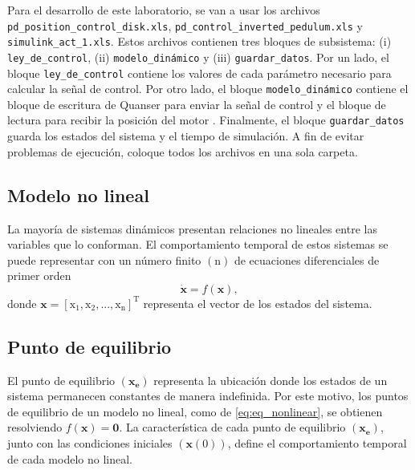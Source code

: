 	Para el desarrollo de este laboratorio, se van a usar los archivos \texttt{pd\_position\_control\_disk.xls}, \texttt{pd\_control\_inverted\_pedulum.xls} y \texttt{simulink\_act\_1.xls}. Estos archivos contienen tres bloques de subsistema: (i) \texttt{ley\_de\_control}, (ii) \texttt{modelo\_dinámico} y (iii) \texttt{guardar\_datos}. Por un lado, el bloque \texttt{ley\_de\_control} contiene los valores de cada parámetro necesario para calcular la señal de control. Por otro lado, el bloque \texttt{modelo\_dinámico} contiene el bloque de escritura de Quanser para enviar la señal de control y el bloque de lectura para recibir la posición del motor . Finalmente, el bloque \texttt{guardar\_datos} guarda los estados del sistema y el tiempo de simulación.  A fin de evitar problemas de ejecución, coloque todos los archivos en una sola carpeta.
	
	\subsection{Modelo no lineal}
	
	La mayoría de sistemas dinámicos presentan relaciones no lineales entre las variables que lo conforman. El comportamiento temporal de estos sistemas se puede representar con un número finito $(\mathrm{n})$ de ecuaciones diferenciales de primer orden
	\begin{equation}
		\mathbf{\dot{x}} = f(\mathbf{x}),
		\label{eq:eq_nonlinear}
	\end{equation}
	\noindent donde $\mathbf{x}=[\mathrm{x_1, x_2,..., x_n }]^\mathrm{T}$ representa el vector de los estados del sistema.
	
	\subsection{Punto de equilibrio}
	El punto de equilibrio $(\mathbf{x_e})$ representa la ubicación donde los estados de un sistema permanecen constantes de manera indefinida. Por este motivo, los puntos de equilibrio de un modelo no lineal, como de \eqref{eq:eq_nonlinear}, se obtienen resolviendo $f(\mathbf{x})=\mathbf{0}$. La característica de cada punto de equilibrio $(\mathbf{x_e})$, junto con las condiciones iniciales $(\mathbf{x}(0))$, define el comportamiento temporal de cada modelo no lineal.
	
	
